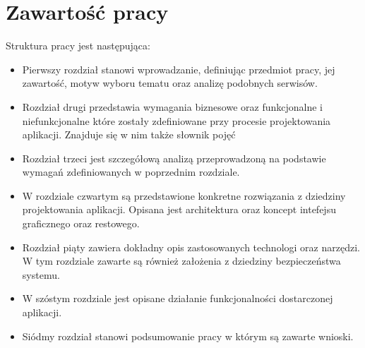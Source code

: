 \section{Zawartość pracy}
\label{sec:zawartoscPracy}
Struktura pracy jest następująca: 
\begin{itemize}
\item Pierwszy rozdział stanowi wprowadzanie, definiując przedmiot pracy, jej zawartość,  motyw wyboru tematu oraz analizę podobnych serwisów. 
\item Rozdział drugi przedstawia wymagania biznesowe oraz funkcjonalne i niefunkcjonalne które zostały zdefiniowane przy procesie projektowania aplikacji. Znajduje się w nim także słownik pojęć 
\item Rozdział trzeci jest szczegółową analizą przeprowadzoną na podstawie wymagań zdefiniowanych w poprzednim rozdziale. 
\item W rozdziale czwartym są przedstawione konkretne rozwiązania z dziedziny projektowania aplikacji. Opisana jest architektura oraz koncept intefejsu graficznego oraz restowego. 
\item Rozdział piąty zawiera dokładny opis zastosowanych technologi oraz narzędzi. W tym rozdziale zawarte są również założenia z dziedziny bezpieczeństwa systemu.
\item W szóstym rozdziale jest opisane działanie funkcjonalności dostarczonej aplikacji. 
\item Siódmy rozdział stanowi podsumowanie pracy w którym są zawarte wnioski.
\end{itemize}


